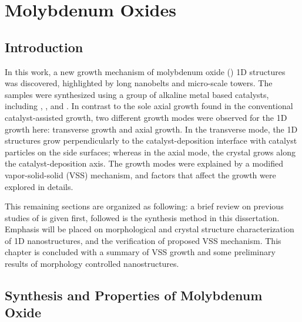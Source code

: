 \chapter{Molybdenum Oxides}

\section{Introduction}

In this work, a new growth mechanism of molybdenum oxide () 1D structures was discovered, highlighted by  long nanobelts and micro-scale towers. The samples were synthesized using a group of alkaline metal based catalysts, including , , and . In contrast to the sole axial growth found in the conventional catalyst-assisted growth, two different growth modes were observed for the  1D growth here: transverse growth and axial growth. In the transverse mode, the 1D structures grow perpendicularly to the catalyst-deposition interface with catalyst particles on the side surfaces; whereas in the axial mode, the crystal grows along the catalyst-deposition axis. The growth modes were explained by a modified vapor-solid-solid (VSS) mechanism, and factors that affect the growth were explored in details. 

This remaining sections are organized as following: a brief review on previous studies of  is given first, followed is the synthesis method in this dissertation. Emphasis will be placed on morphological and crystal structure characterization of 1D  nanostructures, and the verification of proposed VSS mechanism. This chapter is concluded with a summary of VSS growth and some preliminary results of morphology controlled  nanostructures. 

\section{Synthesis and Properties of Molybdenum Oxide}

